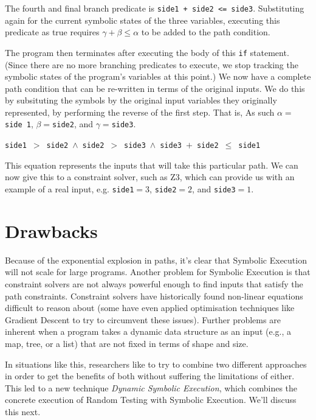 The fourth and final branch predicate is {\tt side1 + side2 <= side3}.
Substituting again for the current symbolic states of the three variables, 
executing this predicate as true requires $\gamma + \beta \leq \alpha$ to be
added to the path condition. 

The program then terminates after executing the body of this {\tt if} statement.
(Since there are no more branching predicates to execute, we stop tracking the
symbolic states of the program's variables at this point.) We now have a
complete path condition that can be re-written in terms of the original inputs.
We do this by subsituting the symbols by the original input variables they
originally represented, by performing the reverse of the first step. That is, As
such $\alpha = ${\tt side 1}, $\beta = ${\tt side2}, and $\gamma = ${\tt side3}.

\begin{center}
{\tt side1}~$ > $~{\tt side2}~$ \wedge $~{\tt side2}~$ > $~{\tt side3}~$ \wedge
$~{\tt side3}~$ + $~{\tt side2}~$ \leq $~{\tt side1}
\end{center}

This equation represents the inputs that will take this particular path. We can
now give this to a constraint solver, such as Z3, which can provide us with an
example of a real input, e.g. {\tt side1}$ =
3$, {\tt side2}$ = 2$, and {\tt side3}$ = 1$.

\section{Drawbacks}

Because of the exponential explosion in paths, it's clear that Symbolic
Execution will not scale for large programs. Another problem for Symbolic
Execution is that constraint solvers are not always powerful enough to find
inputs that satisfy the path constraints. Constraint solvers have historically
found non-linear equations difficult to reason about (some have even applied
optimisation techniques like Gradient Descent to try to circumvent these
issues). Further problems are inherent when a program takes a dynamic data
structure as an input (e.g., a map, tree, or a list) that are not fixed in terms
of shape and size. 

In situations like this, researchers like to try to combine two different
approaches in order to get the benefits of both without suffering the
limitations of either. This led to a new technique {\it Dynamic Symbolic
Execution}, which combines the concrete execution of Random Testing with
Symbolic Execution. We'll discuss this next.

